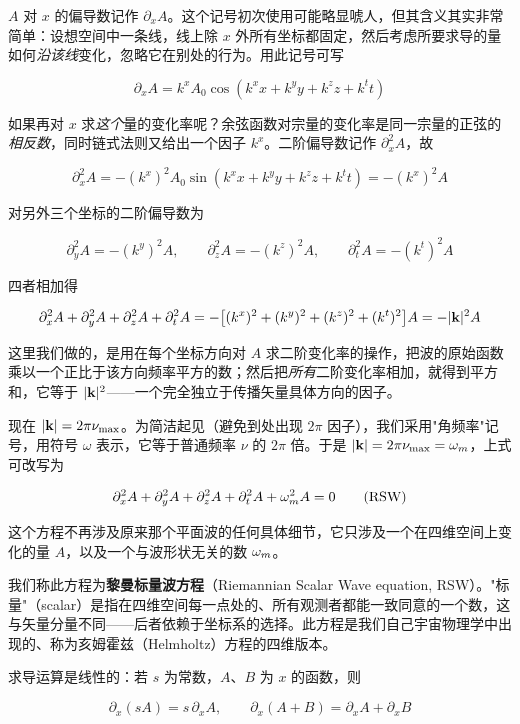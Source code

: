 $A$ 对 $x$ 的偏导数记作 $\partial_{x}A$。这个记号初次使用可能略显唬人，但其含义其实非常简单：设想空间中一条线，线上除 $x$ 外所有坐标都固定，然后考虑所要求导的量如何\emph{沿该线}变化，忽略它在别处的行为。用此记号可写

\[
\partial_{x}A=k^{x}A_{0}\cos(k^{x}x+k^{y}y+k^{z}z+k^{t}t)
\]

如果再对 $x$ 求\emph{这个}量的变化率呢？余弦函数对宗量的变化率是同一宗量的正弦的\emph{相反数}，同时链式法则又给出一个因子 $k^{x}$。二阶偏导数记作 $\partial_{x}^{2}A$，故

\[
\partial_{x}^{2}A=-(k^{x})^{2}A_{0}\sin(k^{x}x+k^{y}y+k^{z}z+k^{t}t)=-(k^{x})^{2}A
\]

对另外三个坐标的二阶偏导数为

\[
\partial_{y}^{2}A=-(k^{y})^{2}A,\qquad \partial_{z}^{2}A=-(k^{z})^{2}A,\qquad \partial_{t}^{2}A=-(k^{t})^{2}A
\]

四者相加得

\[
\partial_{x}^{2}A+\partial_{y}^{2}A+\partial_{z}^{2}A+\partial_{t}^{2}A
=-\bigl[(k^{x})^{2}+(k^{y})^{2}+(k^{z})^{2}+(k^{t})^{2}\bigr]A=-|\mathbf{k}|^{2}A
\]

这里我们做的，是用在每个坐标方向对 $A$ 求二阶变化率的操作，把波的原始函数乘以一个正比于该方向频率平方的数；然后把\emph{所有}二阶变化率相加，就得到平方和，它等于 $|\mathbf{k}|^{2}$——一个完全独立于传播矢量具体方向的因子。

现在 $|\mathbf{k}|=2\pi\nu_{\max}$。为简洁起见（避免到处出现 $2\pi$ 因子），我们采用"角频率"记号，用符号 $\omega$ 表示，它等于普通频率 $\nu$ 的 $2\pi$ 倍。于是 $|\mathbf{k}|=2\pi\nu_{\max}=\omega_m$，上式可改写为

\begin{equation}
\partial_{x}^{2}A+\partial_{y}^{2}A+\partial_{z}^{2}A+\partial_{t}^{2}A+\omega_m^{2}A=0 \tag{RSW}
\end{equation}

这个方程不再涉及原来那个平面波的任何具体细节，它只涉及一个在四维空间上变化的量 $A$，以及一个与波形状无关的数 $\omega_m$。

我们称此方程为\textbf{黎曼标量波方程}（Riemannian Scalar Wave equation, RSW）。"标量"（scalar）是指在四维空间每一点处的、所有观测者都能一致同意的一个数，这与矢量分量不同——后者依赖于坐标系的选择。此方程是我们自己宇宙物理学中出现的、称为亥姆霍兹（Helmholtz）方程的四维版本。

求导运算是线性的：若 $s$ 为常数，$A$、$B$ 为 $x$ 的函数，则

\[
\partial_{x}(sA)=s\,\partial_{x}A,\qquad \partial_{x}(A+B)=\partial_{x}A+\partial_{x}B
\]

